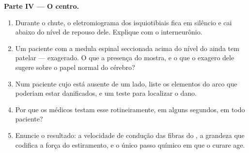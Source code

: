 \begin{problem}
\medskip
\noindent\textbf{Parte IV --- O centro.}
\begin{enumerate}[resume]
  \item Durante o chute, o eletromiograma dos isquiotibiais fica em
        silêncio e cai abaixo do nível de repouso dele. Explique com o
        interneurônio.
  \item Um paciente com a medula espinal seccionada acima do nível do
         ainda tem  patelar --- exagerado. O que a
        presença do  mostra, e o que o exagero dele sugere sobre
        o papel normal do cérebro?
  \item Num paciente cujo  está ausente de um lado, liste os
        elementos do arco que poderiam estar danificados, e um teste
        para localizar o dano.
  \item Por que os médicos testam esse  rotineiramente, em
        alguns segundos, em todo paciente?
  \item Enuncie o resultado: a velocidade de condução das fibras do
        , a grandeza que codifica a força do estiramento, e o
        único passo químico em que o curare age.
\end{enumerate}
\end{problem}
